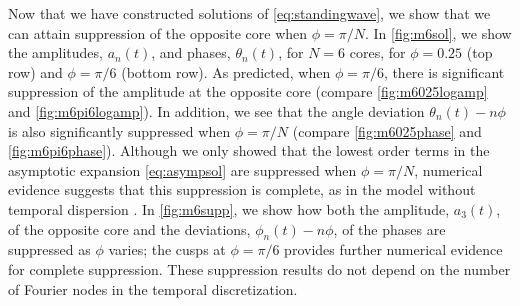 \documentclass[11pt,reqno]{amsart}
\begin{document}
Now that we have constructed  solutions of \cref{eq:standingwave}, we show that we can attain suppression of the opposite core when $\phi=\pi/N$. In \cref{fig:m6sol}, we show the amplitudes, $a_n(t)$, and phases, $\theta_n(t)$, for $N=6$ cores, for $\phi=0.25$ (top row) and $\phi=\pi/6$ (bottom row). As predicted, when $\phi=\pi/6$, there is significant suppression of the amplitude at the opposite core (compare \cref{fig:m6025logamp} and \cref{fig:m6pi6logamp}). In addition, we see that the angle deviation $\theta_n(t) - n \phi$ is also significantly suppressed when $\phi=\pi/N$ (compare \cref{fig:m6025phase} and \cref{fig:m6pi6phase}). Although we only showed that the lowest order terms in the asymptotic expansion \cref{eq:asympsol} are suppressed when $\phi=\pi/N$, numerical evidence suggests that this suppression is complete, as in the model without temporal dispersion \cite{parker2021}. In \cref{fig:m6supp}, we show how both the amplitude, $a_3(t)$, of the opposite core and the deviations, $\phi_n(t) - n \phi$, of the phases are suppressed as $\phi$ varies; the cusps at $\phi=\pi/6$ provides further numerical evidence for complete suppression. These suppression results do not depend on the number of Fourier nodes in the temporal discretization.
\end{document}
